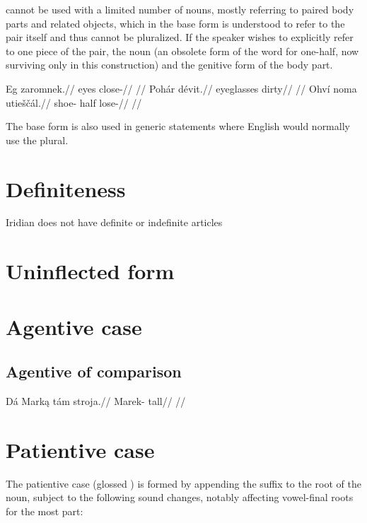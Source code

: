  cannot be used with a limited number of nouns, mostly referring to paired body parts and related objects, which in the base form is understood to refer to the pair itself and thus cannot be pluralized. If the speaker wishes to explicitly refer to one piece of the pair, the noun  (an obsolete form of the word for one-half, now surviving only in this construction) and the genitive form of the body part.

\pex
\begingl
\gla Eg zaromnek.//
\glb eyes close-//
\glft {}//
\endgl
\xe
\pex
\begingl
\gla Poh\'ar d\'evit.//
\glb eyeglasses dirty//
\glft {}//
\endgl
\xe
\pex
\begingl
\gla Ohv\'i noma utie\v{s}\v{c}\'al.//
\glb shoe- half lose-//
\glft {}//
\endgl
\xe

The base form is also used in generic statements where English would normally use the plural.

\section{Definiteness}
Iridian does not have definite or indefinite articles

\section{Uninflected form}

\section{Agentive case}

\subsection{Agentive of comparison}
\pex
\begingl
\gla D\'a Mark\k{a} t\'am stroja.//
\glb {} Marek-  tall//
\glft {}//
\endgl
\xe

\section{Patientive case}

The patientive case (glossed ) is formed by appending the suffix  to the root of the noun, subject to the following sound changes, notably affecting vowel-final roots for the most part:

